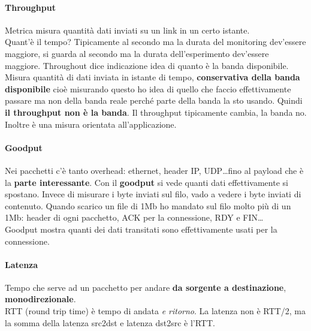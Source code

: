 \documentclass[10pt]{book}
\begin{document}
\paragraph{Throughput} Metrica misura quantità dati inviati su un link in un certo istante.\\
Quant'è il tempo? Tipicamente al secondo ma la durata del monitoring dev'essere maggiore, si guarda al secondo ma la durata dell'esperimento dev'essere maggiore. Throughout dice  indicazione idea di quanto è la banda disponibile.\\
Misura quantità di dati inviata in istante di tempo, \textbf{conservativa della banda disponibile} cioè misurando questo ho idea di quello che faccio effettivamente passare ma non della banda reale perché parte della banda la sto usando. Quindi \textbf{il throughput non è la banda}. Il throughput tipicamente cambia, la banda no. Inoltre è una misura orientata all'applicazione.
\paragraph{Goodput} Nei pacchetti c'è tanto overhead: ethernet, header IP, UDP\ldots fino al payload che è la \textbf{parte interessante}. Con il \textbf{goodput} si vede quanti dati effettivamente si spostano. Invece di misurare i byte inviati sul filo, vado a vedere i byte inviati di contenuto. Quando scarico un file di 1Mb ho mandato sul filo molto più di un 1Mb: header di ogni pacchetto, ACK per la connessione, RDY e FIN\ldots\\
Goodput mostra quanti dei dati transitati sono effettivamente usati per la connessione.
\paragraph{Latenza} Tempo che serve ad un pacchetto per andare \textbf{da sorgente a destinazione}, \textbf{monodirezionale}.\\
RTT (round trip time) è tempo di andata \textit{e ritorno}. La latenza non è RTT/2, ma la somma della latenza src2dst e latenza dst2src è l'RTT.
\end{document}
